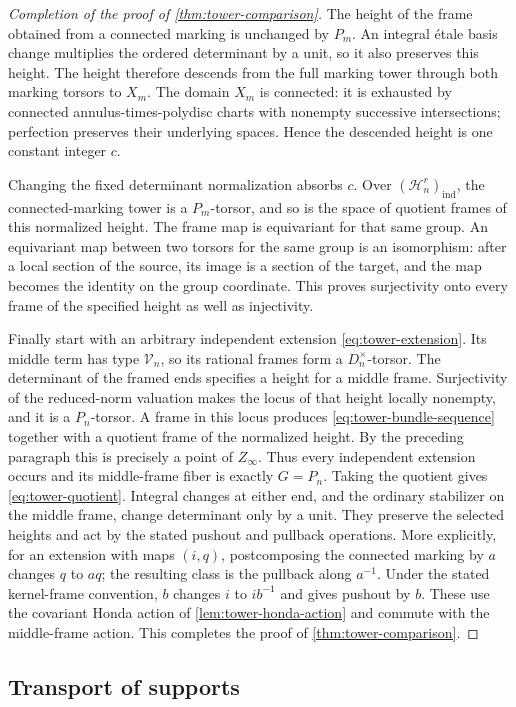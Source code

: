 \begin{proof}[Completion of the proof of \cref{thm:tower-comparison}]
The height of the frame obtained from a connected marking is unchanged
by $P_m$. An integral \'{e}tale basis change multiplies the ordered
determinant by a unit, so it also preserves this height. The height
therefore descends from the full marking tower through both marking
torsors to $X_m$. The domain $X_m$ is connected: it is exhausted by
connected annulus-times-polydisc charts with nonempty successive
intersections; perfection preserves their underlying spaces. Hence
the descended height is one constant integer $c$.

Changing the fixed determinant normalization absorbs $c$. Over
$(\mathcal H_n^r)_{\mathrm{ind}}$, the connected-marking tower is
a $P_m$-torsor, and so is the space of quotient frames of this
normalized height. The frame map is equivariant for that same group.
An equivariant map between two torsors for the same group is an
isomorphism: after a local section of the source, its image is a
section of the target, and the map becomes the identity on the
group coordinate. This proves surjectivity onto every frame of the
specified height as well as injectivity.

Finally start with an arbitrary independent extension
\eqref{eq:tower-extension}. Its middle term has type $\mathcal V_n$,
so its rational frames form a $D_n^{\times}$-torsor. The determinant
of the framed ends specifies a height for a middle frame. Surjectivity
of the reduced-norm valuation makes the locus of that height locally
nonempty, and it is a $P_n$-torsor. A frame in this locus produces
\eqref{eq:tower-bundle-sequence} together with a quotient frame of
the normalized height. By the preceding paragraph this is precisely
a point of $Z_\infty$. Thus every independent extension occurs and
its middle-frame fiber is exactly $G=P_n$. Taking the quotient gives
\eqref{eq:tower-quotient}. Integral changes at either end, and the
ordinary stabilizer on the middle frame, change determinant only by
a unit. They preserve the selected heights and act by the stated
pushout and pullback operations. More explicitly, for an extension
with maps $(i,q)$, postcomposing the connected marking by $a$ changes
$q$ to $aq$; the resulting class is the pullback along $a^{-1}$.
Under the stated kernel-frame convention, $b$ changes $i$ to
$ib^{-1}$ and gives pushout by $b$. These use the covariant Honda
action of \cref{lem:tower-honda-action} and commute with the
middle-frame action. This completes the proof of
\cref{thm:tower-comparison}.
\end{proof}

\subsection{Transport of supports}

